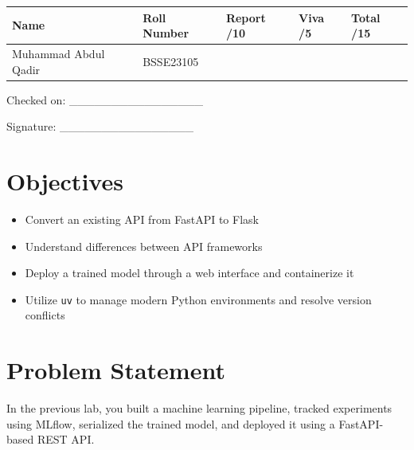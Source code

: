 \documentclass[12pt,a4paper]{article}
\begin{document}
\renewcommand{\arraystretch}{2.0}
\begin{tabularx}{\textwidth}{|Y|Y|Y|Y|Y|}
\hline
\textbf{Name} & \textbf{Roll Number} & \textbf{Report /10} & \textbf{Viva /5} & \textbf{Total /15} \\
\hline
Muhammad Abdul Qadir & BSSE23105 & & & \\
\hline
\end{tabularx}
\renewcommand{\arraystretch}{1.0}

\vspace{12pt}

\begin{flushright}
Checked on: \_\_\_\_\_\_\_\_\_\_\_\_\_\_\_\_

\vspace{6pt}
Signature: \_\_\_\_\_\_\_\_\_\_\_\_\_\_\_\_
\end{flushright}

\newpage


\section*{Objectives}

\begin{itemize}
\item Convert an existing API from FastAPI to Flask
\item Understand differences between API frameworks
\item Deploy a trained model through a web interface and containerize it
\item Utilize \texttt{uv} to manage modern Python environments and resolve version conflicts
\end{itemize}


\section*{Problem Statement}

In the previous lab, you built a machine learning pipeline, tracked experiments using MLflow, serialized the trained model, and deployed it using a FastAPI-based REST API.
\end{document}
